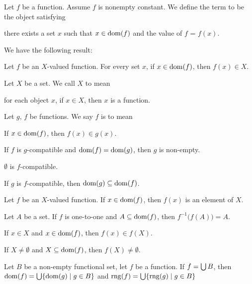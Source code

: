 \documentclass{article}
\begin{document}
\begin{definition}
Let $f$ be a function. Assume $f$ is nonempty constant.
We define the term  to be the object satisfying
\begin{defn}
\item there exists a set $x$ such that $x\in\operatorname{dom}(f)$ and the value of
  $f$ = $f(x)$.
\end{defn}
\end{definition}

We have the following result:
\begin{thm}
\item\label{funct1:102} Let $f$ be an $X$-valued function.
  For every set $x$, if $x\in\operatorname{dom}(f)$, then $f(x)\in X$.
\end{thm}

\begin{definition}
Let $X$ be a set. We call $X$  to mean
\begin{defn}
\item for each object $x$, if $x\in X$, then $x$ is a function.
\end{defn}
\end{definition}

\begin{definition}
Let $g$, $f$ be functions. We say $f$ is  to mean
\begin{defn}
\item If $x\in\operatorname{dom}(f)$, then $f(x)\in g(x)$.
\end{defn}
\end{definition}

\begin{thm}
\item\label{funct1:103} If $f$ is $g$-compatible and $\operatorname{dom}(f)=\operatorname{dom}(g)$,
  then $g$ is non-empty.
\item\label{funct1:104} $\emptyset$ is $f$-compatible.
\item\label{funct1:105} If $g$ is $f$-compatible, then $\operatorname{dom}(g)\subseteq\operatorname{dom}(f)$.
\item\label{funct1:106} Let $f$ be an $X$-valued function.
  If $x\in\operatorname{dom}(f)$, then $f(x)$ is an element of $X$.
\item\label{funct1:107} Let $A$ be a set. If $f$ is one-to-one and
  $A\subseteq\operatorname{dom}(f)$, then $f^{-1}\bigl(f(A)\bigr)=A$.
\item\label{funct1:108} If $x\in X$ and $x\in\operatorname{dom}(f)$, then $f(x)\in f(X)$.
\item\label{funct1:109} If $X\neq\emptyset$ and $X\subseteq\operatorname{dom}(f)$,
  then $f(X)\neq\emptyset$.
\item\label{funct1:110} Let $B$ be a non-empty functional set, let $f$
  be a function. If $f=\bigcup B$, then $\operatorname{dom}(f)=\bigcup\{\operatorname{dom}(g)\mid g\in B\}$
  and $\operatorname{rng}(f)=\bigcup\{\operatorname{rng}(g)\mid g\in B\}$
\end{thm}
\end{document}
